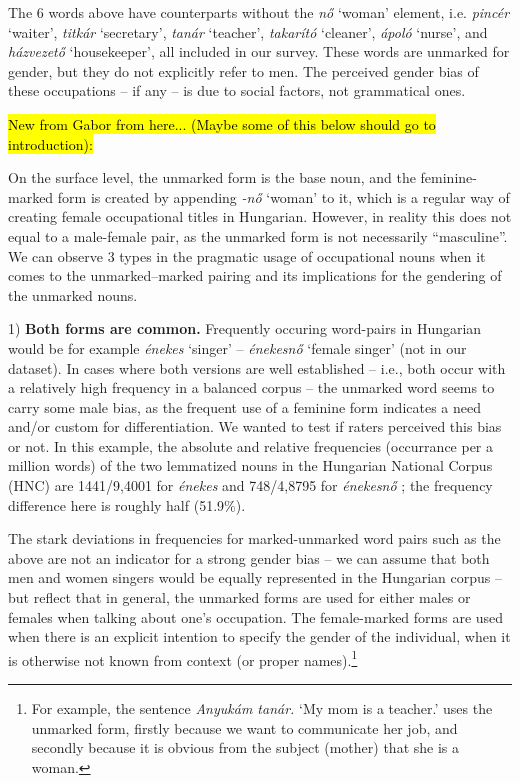 \documentclass[11pt]{article}
\begin{document}
The 6 words above have counterparts without the \textit{nő} `woman' element, i.e. \textit{pincér} `waiter', \textit{titkár} `secretary', \textit{tanár} `teacher', \textit{takarító} `cleaner', \textit{ápoló} `nurse', and \textit{házvezető} `housekeeper', all included in our survey. These words are unmarked for gender, but they do not explicitly refer to men. The perceived gender bias of these occupations -- if any -- is due to social factors, not grammatical ones.

\hl{New from Gabor from here... (Maybe some of this below should go to introduction):}

On the surface level, the unmarked form is the base noun, and the feminine-marked form is created by appending \textit{-nő} `woman' to it, which is a regular way of creating female occupational titles in Hungarian. However, in reality this does not equal to a male-female pair, as the unmarked form is not necessarily ``masculine''. We can observe 3 types in the pragmatic usage of occupational nouns when it comes to the unmarked--marked pairing and its implications for the gendering of the unmarked nouns.

1) \textbf{Both forms are common.} Frequently occuring word-pairs in Hungarian would be for example \textit{énekes} `singer' -- \textit{énekesnő} `female singer' (not in our dataset). In cases where both versions are well established -- i.e., both occur with a relatively high frequency in a balanced corpus -- the unmarked word seems to carry some male bias, as the frequent use of a feminine form indicates a need and/or custom for differentiation. We wanted to test if raters perceived this bias or not. In this example, the absolute and relative frequencies (occurrance per a million words) of the two lemmatized nouns in the Hungarian National Corpus (HNC) are 1441/9,4001 for \textit{énekes} and 748/4,8795 for \textit{énekesnő} \citep{varadi_2002_hungarian, oravecz_2014_hungarian}; the frequency difference here is roughly half (51.9\%).

The stark deviations in frequencies for marked-unmarked word pairs such as the above are not an indicator for a strong gender bias -- we can assume that both men and women singers would be equally represented in the Hungarian corpus -- but reflect that in general, the unmarked forms are used for either males or females when talking about one's occupation. The female-marked forms are used when there is an explicit intention to specify the gender of the individual, when it is otherwise not known from context (or proper names).\footnote{For example, the sentence \textit{Anyukám tanár.} `My mom is a teacher.' uses the unmarked form, firstly because we want to communicate her job, and secondly because it is obvious from the subject (mother) that she is a woman.}
\end{document}
